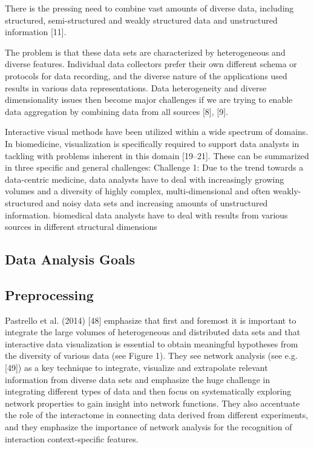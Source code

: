 \documentclass[10pt,a4paper]{article}
\begin{document}
	There is the pressing need to combine vast amounts of diverse data, including
	structured, semi-structured and weakly structured data and unstructured information
	[11]. \cite{Holzinger2014}
	
	The problem is that these data sets are characterized by heterogeneous and
	diverse features. Individual data collectors prefer their own different schema or
	protocols for data recording, and the diverse nature of the applications used results in
	various data representations. Data heterogeneity and diverse
	dimensionality issues then become major challenges if we are trying to enable data
	aggregation by combining data from all sources [8], [9]. \cite{Otasek2014}
	
	
	Interactive visual methods have been utilized within a wide spectrum of domains.
	In biomedicine, visualization is specifically required to support data analysts in
	tackling with problems inherent in this domain [19–21]. These can be summarized
	in three specific and general challenges:
	Challenge 1: Due to the trend towards a data-centric medicine, data analysts
	have to deal with increasingly growing volumes and a diversity of highly complex,
	multi-dimensional and often weakly-structured and noisy data sets and
	increasing amounts of unstructured information. biomedical data analysts have to deal with results from various sources in different
	structural dimensions \cite{Turkay2014}
	
	\subsection{Data Analysis Goals}
	
	\subsection{Preprocessing}
	
	Pastrello et al. (2014) [48] emphasize that first and foremost it is important to
	integrate the large volumes of heterogeneous and distributed data sets and that
	interactive data visualization is essential to obtain meaningful hypotheses from the
	diversity of various data (see Figure 1). They see network analysis (see e.g. [49]) as
	a key technique to integrate, visualize and extrapolate relevant information from
	diverse data sets and emphasize the huge challenge in integrating different types of
	data and then focus on systematically exploring network properties to gain insight
	into network functions. They also accentuate the role of the interactome in connecting
	data derived from different experiments, and they emphasize the importance of
	network analysis for the recognition of interaction context-specific features. \cite{Holzinger2014}
	
\end{document}

